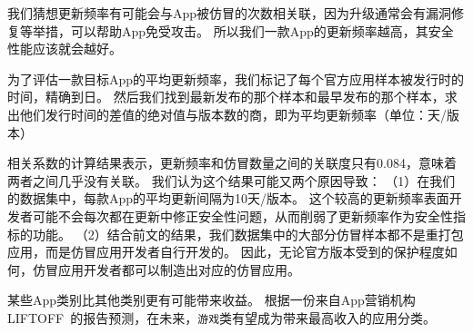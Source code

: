 我们猜想更新频率有可能会与App被仿冒的次数相关联，因为升级通常会有漏洞修复等举措，可以帮助App免受攻击。
所以我们一款App的更新频率越高，其安全性能应该就会越好。

为了评估一款目标App的平均更新频率，我们标记了每个官方应用样本被发行时的时间，精确到日。
然后我们找到最新发布的那个样本和最早发布的那个样本，求出他们发行时间的差值的绝对值与版本数的商，即为平均更新频率（单位：天/版本）

相关系数的计算结果表示，更新频率和仿冒数量之间的关联度只有0.084，意味着两者之间几乎没有关联。
我们认为这个结果可能又两个原因导致：
（1）在我们的数据集中，每款App的平均更新间隔为10天/版本。
这个较高的更新频率表面开发者可能不会每次都在更新中修正安全性问题，从而削弱了更新频率作为安全性指标的功能。
（2）结合前文的结果，我们数据集中的大部分仿冒样本都不是重打包应用，而是仿冒应用开发者自行开发的。
因此，无论官方版本受到的保护程度如何，仿冒应用开发者都可以制造出对应的仿冒应用。

某些App类别比其他类别更有可能带来收益。
根据一份来自App营销机构LIFTOFF~\cite{LIFTOFF_report}的报告预测，在未来，\texttt{游戏}类有望成为带来最高收入的应用分类。

